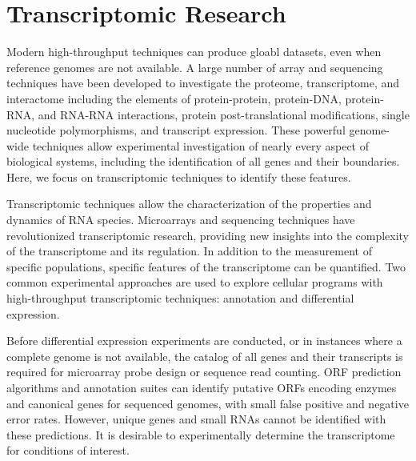 \section{Transcriptomic Research}
Modern high-throughput techniques can produce gloabl datasets, even when reference genomes are not available.\cite{200} A large number of array and sequencing techniques have been developed to investigate the proteome, transcriptome, and interactome including the elements of protein-protein,\cite{141} protein-DNA,\cite{142,143,144} protein-RNA,\cite{145} and RNA-RNA interactions,\cite{146,147,149} protein post-translational modifications,\cite{149} single nucleotide polymorphisms,\cite{150} and transcript expression.\cite{151,152,153,154} These powerful genome-wide techniques allow experimental investigation of nearly every aspect of biological systems, including the identification of all genes and their boundaries. Here, we focus on transcriptomic techniques to identify these features. 

Transcriptomic techniques allow the characterization of the properties and dynamics of RNA species. Microarrays and sequencing techniques have revolutionized transcriptomic research, providing new insights into the complexity of the transcriptome\cite{152,154,155,156} and its regulation.\cite{157} In addition to the measurement of specific populations\cite{194,195}, specific features of the transcriptome can be quantified.\cite{193} Two common experimental approaches are used to explore cellular programs with high-throughput transcriptomic techniques: annotation and differential expression.

Before differential expression experiments are conducted, or in instances where a complete genome is not available, the catalog of all genes and their transcripts is required for microarray probe design or sequence read counting. ORF prediction algorithms\cite{158,159} and annotation suites\cite{160,161} can identify putative ORFs encoding enzymes and canonical genes for sequenced genomes, with small false positive and negative error rates. However, unique genes and small RNAs cannot be identified with these predictions. It is desirable to experimentally determine the transcriptome for conditions of interest.

